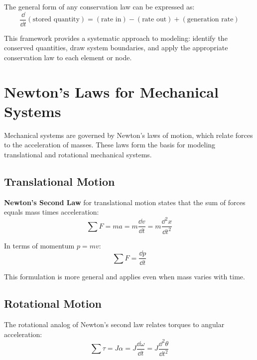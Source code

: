 The general form of any conservation law can be expressed as:
\begin{equation}
\frac{\dd}{\dd t}(\text{stored quantity}) = (\text{rate in}) - (\text{rate out}) + (\text{generation rate})
\label{eq:conservation_general}
\end{equation}

This framework provides a systematic approach to modeling: identify the conserved quantities, draw system boundaries, and apply the appropriate conservation law to each element or node.

\section{Newton's Laws for Mechanical Systems}
\label{sec:newtons_laws}

Mechanical systems are governed by Newton's laws of motion, which relate forces to the acceleration of masses. These laws form the basis for modeling translational and rotational mechanical systems.

\subsection{Translational Motion}

\textbf{Newton's Second Law} for translational motion states that the sum of forces equals mass times acceleration:
\begin{equation}
\sum F = ma = m\frac{\dd v}{\dd t} = m\frac{\dd^2 x}{\dd t^2}
\label{eq:newton_translation}
\end{equation}

In terms of momentum $p = mv$:
\begin{equation}
\sum F = \frac{\dd p}{\dd t}
\end{equation}

This formulation is more general and applies even when mass varies with time.

\subsection{Rotational Motion}

The rotational analog of Newton's second law relates torques to angular acceleration:
\begin{equation}
\sum \tau = J\alpha = J\frac{\dd \omega}{\dd t} = J\frac{\dd^2 \theta}{\dd t^2}
\label{eq:newton_rotation}
\end{equation}

